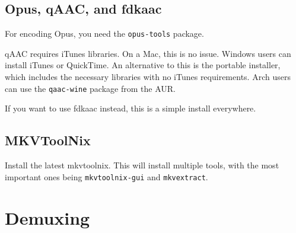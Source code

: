 \documentclass{scrartcl}
\begin{document}
\subsection{Opus, qAAC, and fdkaac}

For encoding Opus, you need the \texttt{opus-tools} package.

qAAC requires iTunes libraries.  On a Mac, this is no issue.  Windows users can install iTunes or QuickTime.  An alternative to this is the portable installer, which includes the necessary libraries with no iTunes requirements.  Arch users can use the \texttt{qaac-wine} package from the AUR.

If you want to use fdkaac instead, this is a simple install everywhere.

\subsection{MKVToolNix}

Install the latest mkvtoolnix.  This will install multiple tools, with the most important ones being \texttt{mkvtoolnix-gui} and \texttt{mkvextract}.

\section{Demuxing}

%
%
\end{document}
